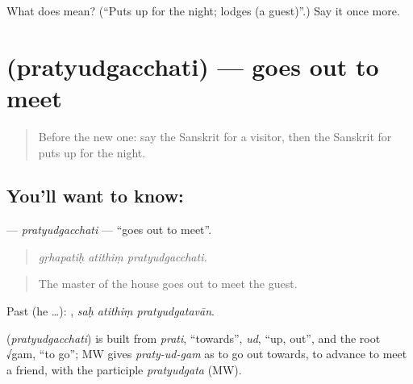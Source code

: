 \begin{tcolorbox}[breakable,colback=teal!4,colframe=teal!35!black,title={Before you move on}]
What does  mean? (\textquotedblleft{}Puts up for the night; lodges (a guest)\textquotedblright{}.) Say it once more.
\end{tcolorbox}
\section[\texorpdfstring{\sk{प्रत्युद्गच्छति} (pratyudgacchati)}{प्रत्युद्गच्छति (pratyudgacchati)}]{ (pratyudgacchati) — goes out to meet}

\label{lesson:SA-C428-pratyudgacchati}



\begin{quote}
Before the new one: say the Sanskrit for a visitor, then the Sanskrit for puts up for the night.
\end{quote}

\subsection*{You'll want to know: }
\textbf{} — \emph{pratyudgacchati} — \textquotedblleft{}goes out to meet\textquotedblright{}.

\begin{quote}
  
\end{quote}

\begin{quote}
\emph{gṛhapatiḥ atithiṃ pratyudgacchati.}
\end{quote}

\begin{quote}
The master of the house goes out to meet the guest.
\end{quote}

Past (he …):   , \emph{saḥ atithiṃ pratyudgatavān}.

\begin{cousinweb}
\textbf{} (\emph{pratyudgacchati}) is built from \emph{prati}, \textquotedblleft{}towards\textquotedblright{}, \emph{ud}, \textquotedblleft{}up, out\textquotedblright{}, and the root √gam, \textquotedblleft{}to go\textquotedblright{}; MW gives \emph{praty-ud-gam} as to go out towards, to advance to meet a friend, with the participle \emph{pratyudgata} (MW).
\end{cousinweb}

